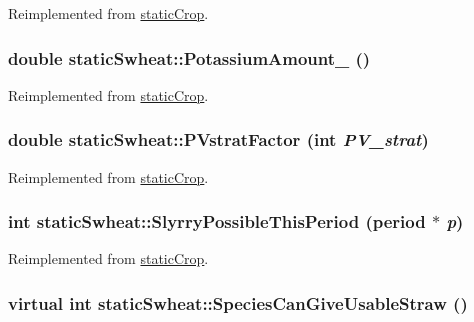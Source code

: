 Reimplemented from \hyperlink{classstatic_crop_abaa5c59d4074d47dedc79172f8326e08}{staticCrop}.\hypertarget{classstatic_swheat_a5fb83e39f6c31dfb736198f0327bad40}{
\subsubsection[{PotassiumAmount\_\-}]{\setlength{\rightskip}{0pt plus 5cm}double staticSwheat::PotassiumAmount\_\- ()}}
\label{classstatic_swheat_a5fb83e39f6c31dfb736198f0327bad40}


Reimplemented from \hyperlink{classstatic_crop_a41fee98d728c7670e6acb504a9b3459d}{staticCrop}.\hypertarget{classstatic_swheat_a0f81ccbd84f84be80a118cb3cee1cfd5}{
\subsubsection[{PVstratFactor}]{\setlength{\rightskip}{0pt plus 5cm}double staticSwheat::PVstratFactor (int {\em PV\_\-strat})}}
\label{classstatic_swheat_a0f81ccbd84f84be80a118cb3cee1cfd5}


Reimplemented from \hyperlink{classstatic_crop_ae4f07498c1616eab212386faf352d348}{staticCrop}.\hypertarget{classstatic_swheat_abd1a6a43b0037471d91dd22e5a30af3f}{
\subsubsection[{SlyrryPossibleThisPeriod}]{\setlength{\rightskip}{0pt plus 5cm}int staticSwheat::SlyrryPossibleThisPeriod ({\bf period} $\ast$ {\em p})}}
\label{classstatic_swheat_abd1a6a43b0037471d91dd22e5a30af3f}


Reimplemented from \hyperlink{classstatic_crop_ada7c8c797de629277a5ba0b0a4a3c17e}{staticCrop}.\hypertarget{classstatic_swheat_a5828fc22617cabf3988ca16ec7a315d1}{
\subsubsection[{SpeciesCanGiveUsableStraw}]{\setlength{\rightskip}{0pt plus 5cm}virtual int staticSwheat::SpeciesCanGiveUsableStraw ()}}
\label{classstatic_swheat_a5828fc22617cabf3988ca16ec7a315d1}


